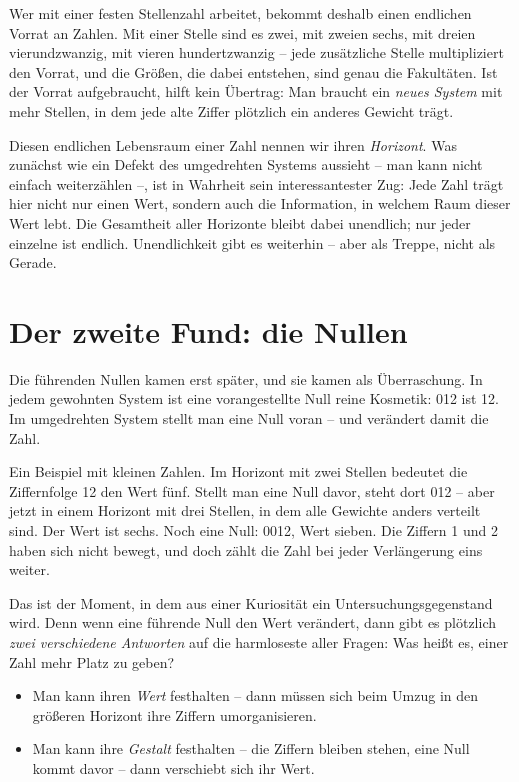 Wer mit einer festen Stellenzahl arbeitet, bekommt deshalb einen
endlichen Vorrat an Zahlen. Mit einer Stelle sind es zwei, mit zweien
sechs, mit dreien vierundzwanzig, mit vieren hundertzwanzig -- jede
zusätzliche Stelle multipliziert den Vorrat, und die Größen, die dabei
entstehen, sind genau die Fakultäten. Ist der Vorrat aufgebraucht,
hilft kein Übertrag: Man braucht ein \emph{neues System} mit mehr
Stellen, in dem jede alte Ziffer plötzlich ein anderes Gewicht trägt.

Diesen endlichen Lebensraum einer Zahl nennen wir ihren
\emph{Horizont}. Was zunächst wie ein Defekt des umgedrehten Systems
aussieht -- man kann nicht einfach weiterzählen --, ist in Wahrheit
sein interessantester Zug: Jede Zahl trägt hier nicht nur einen Wert,
sondern auch die Information, in welchem Raum dieser Wert lebt. Die
Gesamtheit aller Horizonte bleibt dabei unendlich; nur jeder einzelne
ist endlich. Unendlichkeit gibt es weiterhin -- aber als Treppe, nicht
als Gerade.

\section{Der zweite Fund: die Nullen}

Die führenden Nullen kamen erst später, und sie kamen als Überraschung.
In jedem gewohnten System ist eine vorangestellte Null reine Kosmetik:
012 ist 12. Im umgedrehten System stellt man eine Null voran -- und
verändert damit die Zahl.

Ein Beispiel mit kleinen Zahlen. Im Horizont mit zwei Stellen bedeutet
die Ziffernfolge 12 den Wert fünf. Stellt man eine Null davor, steht
dort 012 -- aber jetzt in einem Horizont mit drei Stellen, in dem alle
Gewichte anders verteilt sind. Der Wert ist sechs. Noch eine Null:
0012, Wert sieben. Die Ziffern 1 und 2 haben sich nicht bewegt, und
doch zählt die Zahl bei jeder Verlängerung eins weiter.

Das ist der Moment, in dem aus einer Kuriosität ein
Untersuchungsgegenstand wird. Denn wenn eine führende Null den Wert
verändert, dann gibt es plötzlich \emph{zwei verschiedene Antworten}
auf die harmloseste aller Fragen: Was heißt es, einer Zahl mehr Platz
zu geben?

\begin{itemize}
  \item Man kann ihren \emph{Wert} festhalten -- dann müssen sich beim
        Umzug in den größeren Horizont ihre Ziffern umorganisieren.
  \item Man kann ihre \emph{Gestalt} festhalten -- die Ziffern bleiben
        stehen, eine Null kommt davor -- dann verschiebt sich ihr Wert.
\end{itemize}

